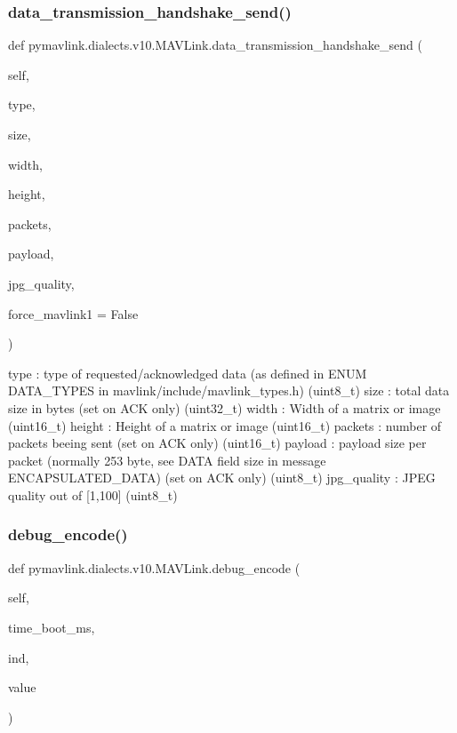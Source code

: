 \begin{DoxyVerb}
\begin{DoxyVerb}
\subsubsection{\texorpdfstring{data\+\_\+transmission\+\_\+handshake\+\_\+send()}{data\_transmission\_handshake\_send()}}
{\footnotesize\ttfamily def pymavlink.\+dialects.\+v10.\+M\+A\+V\+Link.\+data\+\_\+transmission\+\_\+handshake\+\_\+send (\begin{DoxyParamCaption}\item[{}]{self,  }\item[{}]{type,  }\item[{}]{size,  }\item[{}]{width,  }\item[{}]{height,  }\item[{}]{packets,  }\item[{}]{payload,  }\item[{}]{jpg\+\_\+quality,  }\item[{}]{force\+\_\+mavlink1 = {\ttfamily False} }\end{DoxyParamCaption})}

\begin{DoxyVerb}type                      : type of requested/acknowledged data (as defined in ENUM DATA_TYPES in mavlink/include/mavlink_types.h) (uint8_t)
size                      : total data size in bytes (set on ACK only) (uint32_t)
width                     : Width of a matrix or image (uint16_t)
height                    : Height of a matrix or image (uint16_t)
packets                   : number of packets beeing sent (set on ACK only) (uint16_t)
payload                   : payload size per packet (normally 253 byte, see DATA field size in message ENCAPSULATED_DATA) (set on ACK only) (uint8_t)
jpg_quality               : JPEG quality out of [1,100] (uint8_t)\end{DoxyVerb}
 \mbox{\label{classpymavlink_1_1dialects_1_1v10_1_1MAVLink_a1ba6cb28e19c757bde356e136f155de1}} 
\subsubsection{\texorpdfstring{debug\+\_\+encode()}{debug\_encode()}}
{\footnotesize\ttfamily def pymavlink.\+dialects.\+v10.\+M\+A\+V\+Link.\+debug\+\_\+encode (\begin{DoxyParamCaption}\item[{}]{self,  }\item[{}]{time\+\_\+boot\+\_\+ms,  }\item[{}]{ind,  }\item[{}]{value }\end{DoxyParamCaption})}


\end{DoxyVerb}
\end{DoxyVerb}
